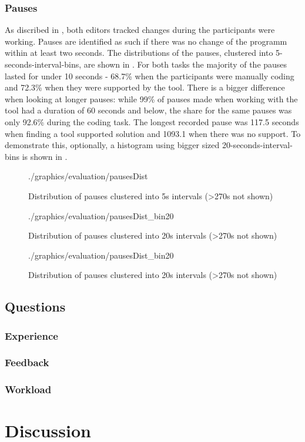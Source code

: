 \subsubsection*{Pauses}
As discribed in , both editors tracked changes during the participants were working. Pauses are identified as such if there was no change of the programm within at least two seconds. The distributions of the pauses, clustered into 5-seconds-interval-bins, are shown in . For both tasks the majority of the pauses lasted for under 10 seconds - 68.7\% when the participants were manually coding and 72.3\% when they were supported by the tool. There is a bigger difference when looking at longer pauses: while 99\% of pauses made when working with the tool had a duration of 60 seconds and below, the share for the same pauses was only 92.6\% during the coding task. The longest recorded pause was 117.5 seconds when finding a tool supported solution and 1093.1 when there was no support. To demonstrate this, optionally, a histogram using bigger sized 20-seconds-interval-bins is shown in .

\begin{figure}[htbp]
	\centering
	\begin{overpic}[width=\linewidth]{./graphics/evaluation/pausesDist}
	\end{overpic}
    \caption{Distribution of pauses clustered into 5s intervals (>270s not shown)}%
	\label{fig:PausesDist}%
\end{figure}

\begin{figure}[htbp]
	\centering
	\begin{overpic}[width=\linewidth]{./graphics/evaluation/pausesDist_bin20}
	\end{overpic}
    \caption{Distribution of pauses clustered into 20s intervals (>270s not shown)}%
	\label{fig:PausesDist20}%
\end{figure}

\begin{figure}[htbp]
	\centering
	\begin{overpic}[width=\linewidth]{./graphics/evaluation/pausesDist_bin20}
	\end{overpic}
    \caption{Distribution of pauses clustered into 20s intervals (>270s not shown)}%
	\label{fig:PausesDist20}%
\end{figure}



\subsection{Questions}

\subsubsection*{Experience}

\subsubsection*{Feedback}

\subsubsection*{Workload}

\section{Discussion}